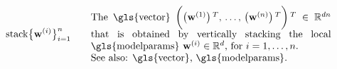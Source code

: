 \begin{align} 
	& {\rm stack} \big\{ \weights^{(\nodeidx)} \big\}_{\nodeidx=1}^{\nrnodes} & \quad & \parbox{.70\textwidth}{The \gls{vector} 
		$\bigg( \big(\weights^{(1)}  \big)\,^{T}, \,\ldots, \,\big(\weights^{(\nrnodes)}  \big)\,^{T} \bigg)\,^{T} \in \mathbb{R}^{\dimlocalmodel\nrnodes}$ that 
		is obtained by vertically stacking the local \gls{modelparams} $\weights^{(\nodeidx)} \in \mathbb{R}^{\dimlocalmodel}$, for $\nodeidx=1,\ldots,\nrnodes$.
		\\ See also: \gls{vector}, \gls{modelparams}. } \nonumber  
\end{align}        


